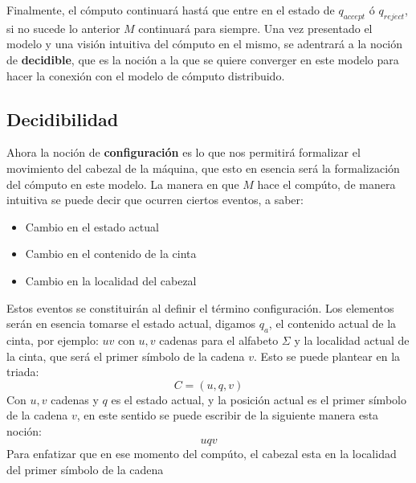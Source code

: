 \documentclass[10pt]{report}
\begin{document}
    \space
    Finalmente, el cómputo continuará hastá que entre en el estado de $q_{accept}$ ó $q_{reject}$,
    si no sucede lo anterior $M$ continuará para siempre.
    Una vez presentado el modelo y una visión intuitiva del cómputo en el mismo, se adentrará a la noción de
    \textbf{decidible}, que es la noción a la que se quiere converger en este modelo para hacer la conexión con el modelo
    de cómputo distribuido.

    \newspace
     \subsection{Decidibilidad}\label{subsec:decidibilidad2}
    Ahora la noción de \textbf{configuración} es lo que nos permitirá formalizar el movimiento del
    cabezal de la máquina, que esto en esencia será la formalización del cómputo en este modelo.
    \newline
    La manera en que $M$ hace el compúto, de manera intuitiva se puede decir que ocurren ciertos eventos, a saber:
    \begin{itemize}
        \item Cambio en el estado actual
        \item Cambio en el contenido de la cinta
        \item Cambio en la localidad del cabezal
    \end{itemize}
    Estos eventos se constituirán al definir el término configuración.
    Los elementos serán en esencia tomarse el estado actual, digamos $q_{a}$, el contenido actual de la cinta, por ejemplo:
    $uv$ con $u,v$ cadenas para el alfabeto $\Sigma$ y la localidad actual de la cinta, que será el primer
    símbolo de la cadena $v$. \newline
    Esto se puede plantear en la triada:
    \begin{equation}
        C = (u,q,v)
    \end{equation}
    Con $u,v$ cadenas y $q$ es el estado actual, y la posición actual es el primer símbolo de la cadena $v$,
    en este sentido se puede escribir de la siguiente manera esta noción:
    \begin{equation}
        uqv
    \end{equation}
    Para enfatizar que en ese momento del compúto, el cabezal esta en la localidad del primer símbolo de la cadena
\end{document}
